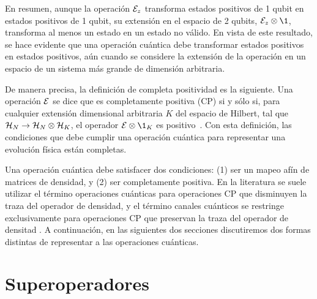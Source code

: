 En resumen, aunque la operación $\mathcal{E}_z$ transforma estados positivos
de 1 qubit en estados positivos de 1 qubit, 
su extensión en el espacio de 2 qubits, $\E_z\otimes\1$,
transforma al menos un estado en un estado no válido. 
En vista de este resultado, se hace evidente que una operación cuántica 
debe transformar estados positivos en estados positivos,
aún cuando se considere la extensión de la operación en 
un espacio de un sistema más grande de dimensión arbitraria.
 

De manera precisa, la definición de completa positividad es la siguiente.
Una operación $\mathcal{E}$ se dice que es completamente positiva (CP)
si y sólo si, para cualquier extensión dimensional arbitraria $K$ 
del espacio de Hilbert, tal que 
$\mathcal{H}_N \rightarrow \mathcal{H}_N \otimes \mathcal{H}_K$,
el operador $\E\otimes\1_K$ es positivo~\cite{bengtsson_zyczkowski_2017}. 
Con esta definición, las condiciones 
que debe cumplir una operación cuántica para representar una evolución física 
están completas.

Una operación cuántica debe satisfacer dos condiciones: (1)
ser un mapeo afín de matrices de densidad, y (2) ser completamente positiva. 
En la literatura se suele utilizar el término operaciones 
cuánticas para operaciones CP que disminuyen la traza 
del operador de densidad, y el término canales cuánticos 
se restringe exclusivamente para operaciones CP
que preservan la traza del 
operador de densitad \cite{bengtsson_zyczkowski_2017}. 
A continuación, en las siguientes dos secciones discutiremos 
dos formas distintas de representar a las operaciones cuánticas.



\section{Superoperadores} %


